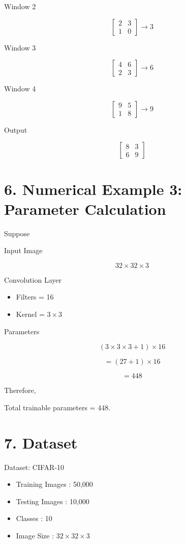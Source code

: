 \documentclass[11pt]{article}
\begin{document}
Window 2

\[
\begin{bmatrix}
2&3\\
1&0
\end{bmatrix}
\rightarrow3
\]

Window 3

\[
\begin{bmatrix}
4&6\\
2&3
\end{bmatrix}
\rightarrow6
\]

Window 4

\[
\begin{bmatrix}
9&5\\
1&8
\end{bmatrix}
\rightarrow9
\]

Output

\[
\begin{bmatrix}
8&3\\
6&9
\end{bmatrix}
\]

\section*{6. Numerical Example 3: Parameter Calculation}

Suppose

Input Image

\[
32\times32\times3
\]

Convolution Layer

\begin{itemize}
\item Filters = 16
\item Kernel = $3\times3$
\end{itemize}

Parameters

\[
(3\times3\times3+1)\times16
\]

\[
=(27+1)\times16
\]

\[
=448
\]

Therefore,

Total trainable parameters = 448.

\section*{7. Dataset}

Dataset: CIFAR-10

\begin{itemize}
\item Training Images : 50,000
\item Testing Images : 10,000
\item Classes : 10
\item Image Size : $32\times32\times3$
\end{itemize}
\end{document}

